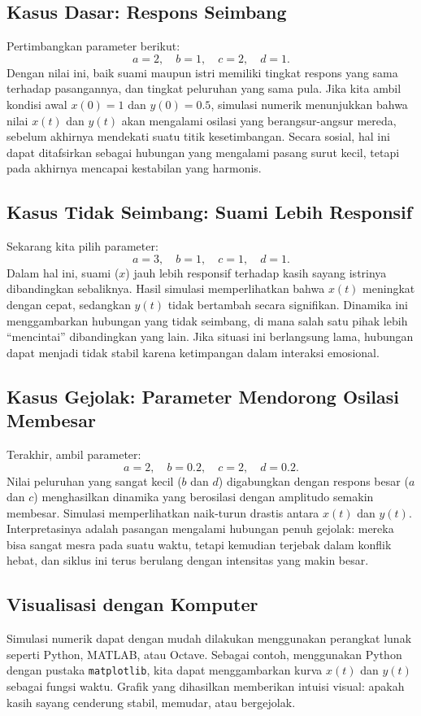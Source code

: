 \documentclass{bukumjh}
\begin{document}
\subsection*{Kasus Dasar: Respons Seimbang}
Pertimbangkan parameter berikut:
\[
a = 2, \quad b = 1, \quad c = 2, \quad d = 1.
\]
Dengan nilai ini, baik suami maupun istri memiliki tingkat respons yang sama terhadap pasangannya, dan tingkat peluruhan yang sama pula. 
Jika kita ambil kondisi awal $x(0) = 1$ dan $y(0) = 0.5$, simulasi numerik menunjukkan bahwa nilai $x(t)$ dan $y(t)$ akan mengalami osilasi yang berangsur-angsur mereda, sebelum akhirnya mendekati suatu titik kesetimbangan. 
Secara sosial, hal ini dapat ditafsirkan sebagai hubungan yang mengalami pasang surut kecil, tetapi pada akhirnya mencapai kestabilan yang harmonis.

\subsection*{Kasus Tidak Seimbang: Suami Lebih Responsif}
Sekarang kita pilih parameter:
\[
a = 3, \quad b = 1, \quad c = 1, \quad d = 1.
\]
Dalam hal ini, suami ($x$) jauh lebih responsif terhadap kasih sayang istrinya dibandingkan sebaliknya. 
Hasil simulasi memperlihatkan bahwa $x(t)$ meningkat dengan cepat, sedangkan $y(t)$ tidak bertambah secara signifikan. 
Dinamika ini menggambarkan hubungan yang tidak seimbang, di mana salah satu pihak lebih “mencintai” dibandingkan yang lain. 
Jika situasi ini berlangsung lama, hubungan dapat menjadi tidak stabil karena ketimpangan dalam interaksi emosional.

\subsection*{Kasus Gejolak: Parameter Mendorong Osilasi Membesar}
Terakhir, ambil parameter:
\[
a = 2, \quad b = 0.2, \quad c = 2, \quad d = 0.2.
\]
Nilai peluruhan yang sangat kecil ($b$ dan $d$) digabungkan dengan respons besar ($a$ dan $c$) menghasilkan dinamika yang berosilasi dengan amplitudo semakin membesar. 
Simulasi memperlihatkan naik-turun drastis antara $x(t)$ dan $y(t)$. 
Interpretasinya adalah pasangan mengalami hubungan penuh gejolak: mereka bisa sangat mesra pada suatu waktu, tetapi kemudian terjebak dalam konflik hebat, dan siklus ini terus berulang dengan intensitas yang makin besar.

\subsection*{Visualisasi dengan Komputer}
Simulasi numerik dapat dengan mudah dilakukan menggunakan perangkat lunak seperti Python, MATLAB, atau Octave. 
Sebagai contoh, menggunakan Python dengan pustaka \texttt{matplotlib}, kita dapat menggambarkan kurva $x(t)$ dan $y(t)$ sebagai fungsi waktu. 
Grafik yang dihasilkan memberikan intuisi visual: apakah kasih sayang cenderung stabil, memudar, atau bergejolak. 
\end{document}
